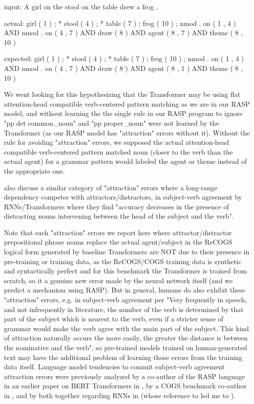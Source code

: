 \documentclass[11pt]{article}
\begin{document}
input: A girl on the stool on the table drew a frog .

actual:   girl ( 1 ) ; * stool ( 4 ) ; * table ( 7 ) ; frog ( 10 ) ; nmod . on ( 1 , 4 ) AND nmod . on ( 4 , 7 ) AND draw ( 8 ) AND agent ( 8 , 7 ) AND theme ( 8 , 10 )

expected: girl ( 1 ) ; * stool ( 4 ) ; * table ( 7 ) ; frog ( 10 ) ; nmod . on ( 1 , 4 ) AND nmod . on ( 4 , 7 ) AND draw ( 8 ) AND agent ( 8 , 1 ) AND theme ( 8 , 10 )

We went looking for this hypothesizing that the \cite{Wu2023} Transformer may be using flat attention-head compatible verb-centered pattern matching as we are in our RASP model,
and without learning the the single rule in our RASP program to ignore "pp det common\_noun" and "pp proper\_noun" were not learned by the Transformer (as our RASP model has "attraction" errors without it). Without the rule for avoiding "attraction" errors, we supposed the actual attention-head compatible verb-centered pattern matched noun (closer to the verb than the actual agent) for a grammar pattern would labeled the agent or theme instead of the appropriate one.

\cite{vanschijndel2019quantitydoesntbuyquality} also discuss a similar category of "attraction" errors where a long-range dependency competes with attractors/distractors, in subject-verb agreement by RNNs/Transformers where they find "accuracy decreases in the presence of distracting nouns intervening between the head of the subject and the verb".

Note that such "attraction" errors we report here where attractor/distractor prepositional phrase nouns replace the actual agent/subject in the ReCOGS logical form generated by \cite{Wu2023} baseline Transformers are NOT due to their presence in pre-training or training data, as the ReCOGS/COGS training data is synthetic and syntactically perfect and for this benchmark the Transformer is trained from scratch, so it a genuine new error made by the neural network itself (and we predict a mechanism using RASP). But in general, humans do also exhibit these "attraction" errors, e.g. in subject-verb agreement per \cite{jespersen1913modernenglishgrammar1954reprint} "Very frequently in speech, and not infrequently in literature, the number of the verb is determined by that part of the subject which is nearest to the verb, even if a stricter sense of grammar would make the verb agree with the main part of the subject. This kind of attraction naturally occurs the more easily, the greater the distance is between the nominative and the verb", so pre-trained models trained on human-generated text may have the additional problem of learning those errors from the training data itself. Language model tendencies to commit subject-verb agreement attraction errors were previously analyzed by a co-author of the RASP language in an earlier paper on BERT Transformers in \cite{goldberg2019assessingbertssyntacticabilities}, by a COGS benchmark co-author in \cite{vanschijndel2019quantitydoesntbuyquality}, and by both together regarding RNNs in \cite{linzen2016assessing} (whose reference to \cite{agreementwithnearestlanguagelog} led me to \cite{jespersen1913modernenglishgrammar1954reprint}).
\end{document}
